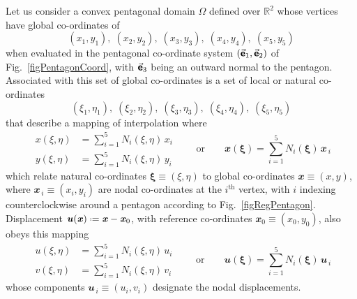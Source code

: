 Let us consider a convex pentagonal domain $\Omega$ defined over $\mathbb{R}^2$ whose vertices have global co-ordinates of
\begin{displaymath}
(x_1, y_1) , \; (x_2, y_2) , \; (x_3, y_3) , \; (x_4, y_4), \; (x_5, y_5)
\end{displaymath}
when evaluated in the pentagonal co-ordinate system $( \vec{\boldsymbol{\mathsf{e}}}_1 , \vec{\boldsymbol{\mathsf{e}}}_2 )$ of Fig.~\ref{figPentagonCoord}, with $\vec{\boldsymbol{\mathsf{e}}}_3$ being an outward normal to the pentagon.  Associated with this set of global co-ordinates is a set of local or natural co-ordinates
\begin{displaymath}
(\xi_1 , \eta_1) , \; (\xi_2 , \eta_2) , \; (\xi_3 , \eta_3) , \; (\xi_4 , \eta_4) , \; (\xi_5 , \eta_5)
\end{displaymath}
that describe a mapping of interpolation where
\begin{equation}
\begin{aligned}
x(\xi, \eta) & = \sum\nolimits_{i=1}^5 N_i (\xi, \eta) \, x_i \\
y(\xi, \eta) & = \sum\nolimits_{i=1}^5 N_i (\xi, \eta) \, y_i
\end{aligned} 
\qquad \text{or} \qquad
\mathbfit{x}(\boldsymbol{\xi}) = \sum_{i=1}^5 N_i (\boldsymbol{\xi}) \, 
\mathbfit{x}_{\,i}
\end{equation}
which relate natural co-ordinates $\boldsymbol{\xi} \equiv (\xi, \eta)$ to global co-ordinates $\mathbfit{x} \equiv (x, y)$, where $\mathbfit{x}_{\,i} \equiv (x_i, y_i)$ are nodal co-ordinates at the $i^{\mathrm{th}}$ vertex, with $i$ indexing counter\-clockwise around a pentagon according to Fig.~\ref{figRegPentagon}.  Displacement $\mathbfit{u} (\mathbfit{x}) \defeq \mathbfit{x} - \mathbfit{x}_0$, with reference co-ordinates $\mathbfit{x}_0 \equiv (x_0, y_0)$, also obeys this mapping
\begin{equation}
\begin{aligned}
u(\xi, \eta) & = \sum\nolimits_{i=1}^5 N_i (\xi, \eta) \, u_i \\
v(\xi, \eta) & = \sum\nolimits_{i=1}^5 N_i (\xi, \eta) \, v_i
\end{aligned} 
\qquad \text{or} \qquad
\mathbfit{u}(\boldsymbol{\xi}) = \sum_{i=1}^5 N_i (\boldsymbol{\xi}) \, 
\mathbfit{u}_{\,i}
\end{equation}
whose components $\mathbfit{u}_{\,i} \equiv (u_i , v_i)$ designate the nodal displacements.

